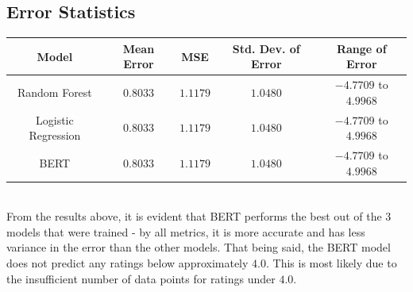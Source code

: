 \documentclass[11pt]{article}
\begin{document}
\subsection{Error Statistics}
\begin{tabular}{c|cccc}
Model & Mean Error & MSE & Std. Dev. of Error & Range of Error\\
\hline
Random Forest & $0.8033$ & $1.1179$ & $1.0480$ & $-4.7709$ to $4.9968$\\
Logistic Regression & $0.8033$ & $1.1179$ & $1.0480$ & $-4.7709$ to $4.9968$\\
BERT & $0.8033$ & $1.1179$ & $1.0480$ & $-4.7709$ to $4.9968$
\end{tabular}\\[2mm]
From the results above, it is evident that BERT performs the best out of the 3 models that were trained - by all metrics, it is more accurate and has less variance in the error than the other models.  That being said, the BERT model does not predict any ratings below approximately $4.0$.  This is most likely due to the insufficient number of data points for ratings under $4.0$.
\end{document}
